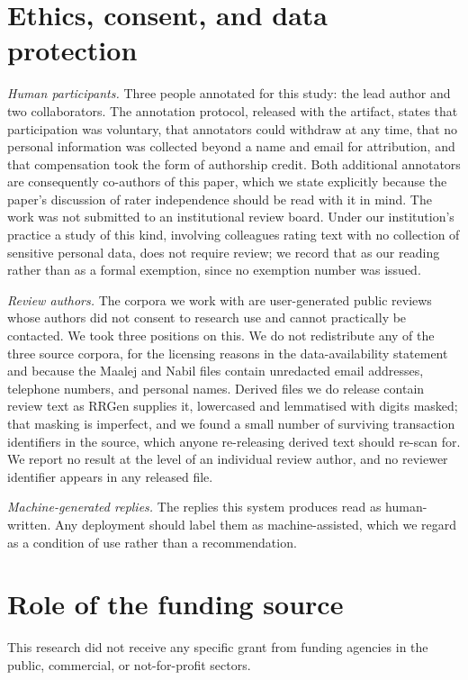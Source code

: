 \documentclass[preprint,12pt]{elsarticle}
\begin{document}
\section*{Ethics, consent, and data protection}
\emph{Human participants.} Three people annotated for this study: the lead author and two
collaborators. The annotation protocol, released with the artifact, states that participation was
voluntary, that annotators could withdraw at any time, that no personal information was collected
beyond a name and email for attribution, and that compensation took the form of authorship credit.
Both additional annotators are consequently co-authors of this paper, which we state explicitly
because the paper's discussion of rater independence should be read with it in mind. The work was
not submitted to an institutional review board. Under our institution's practice a study of this
kind, involving colleagues rating text with no collection of sensitive personal data, does not
require review; we record that as our reading rather than as a formal exemption, since no
exemption number was issued.

\emph{Review authors.} The corpora we work with are user-generated public reviews whose authors
did not consent to research use and cannot practically be contacted. We took three positions on
this. We do not redistribute any of the three source corpora, for the licensing reasons in the
data-availability statement and because the Maalej and Nabil files contain unredacted email
addresses, telephone numbers, and personal names. Derived files we do release contain review text
as RRGen supplies it, lowercased and lemmatised with digits masked; that masking is imperfect, and
we found a small number of surviving transaction identifiers in the source, which anyone
re-releasing derived text should re-scan for. We report no result at the level of an individual
review author, and no reviewer identifier appears in any released file.

\emph{Machine-generated replies.} The replies this system produces read as human-written. Any
deployment should label them as machine-assisted, which we regard as a condition of use rather
than a recommendation.

\section*{Role of the funding source}
This research did not receive any specific grant from funding agencies in the public,
commercial, or not-for-profit sectors.
\end{document}
